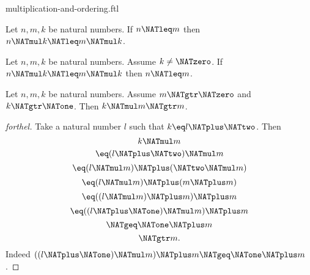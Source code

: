 \documentclass{stex}
\begin{document}
\begin{smodule}{multiplication-and-ordering.ftl}
\begin{corollary}[forthel,id=ARITHMETIC_06_8946886668976128]
  Let $n, m, k$ be natural numbers.
  If $n \NATleq m$ then $n \NATmul k \NATleq m \NATmul k$.
\end{corollary}

\begin{corollary}[forthel,id=ARITHMETIC_06_4374428949413888]
  Let $n, m, k$ be natural numbers.
  Assume $k \neq \NATzero$.
  If $n \NATmul k \NATleq m \NATmul k$ then $n \NATleq m$.
\end{corollary}

\begin{proposition}[forthel,id=ARITHMETIC_06_8813409145454592]
  Let $n, m, k$ be natural numbers.
  Assume $m \NATgtr \NATzero$ and $k \NATgtr \NATone$.
  Then $k \NATmul m \NATgtr m$.
\end{proposition}
\begin{proof}[forthel]
  Take a natural number $l$ such that $k \eq l \NATplus \NATtwo$.
  Then
  \[  k \NATmul m                       \]
  \[    \eq (l \NATplus \NATtwo) \NATmul m             \]
  \[    \eq (l \NATmul m) \NATplus (\NATtwo \NATmul m)   \]
  \[    \eq (l \NATmul m) \NATplus (m \NATplus m)       \]
  \[    \eq ((l \NATmul m) \NATplus m) \NATplus m       \]
  \[    \eq ((l \NATplus \NATone) \NATmul m) \NATplus m       \]
  \[    \NATgeq \NATone \NATplus m                    \]
  \[    \NATgtr m.                          \]
  Indeed $((l \NATplus \NATone) \NATmul m) \NATplus m \NATgeq \NATone \NATplus m$.
\end{proof}
\end{smodule}
\end{document}
